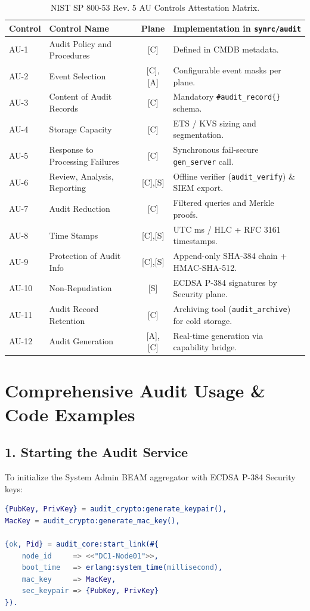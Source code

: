 \documentclass{article}
\begin{document}
\begin{table}[h!]
\centering
\small
\begin{tabular}{lp{6cm}c p{5cm}}
\toprule
\textbf{Control} & \textbf{Control Name} & \textbf{Plane} & \textbf{Implementation in \texttt{synrc/audit}} \\
\midrule
AU-1 & Audit Policy and Procedures & [C] & Defined in CMDB metadata. \\
AU-2 & Event Selection & [C],[A] & Configurable event masks per plane. \\
AU-3 & Content of Audit Records & [C] & Mandatory \texttt{\#audit\_record\{\}} schema. \\
AU-4 & Storage Capacity & [C] & ETS / KVS sizing and segmentation. \\
AU-5 & Response to Processing Failures & [C] & Synchronous fail-secure \texttt{gen\_server} call. \\
AU-6 & Review, Analysis, Reporting & [C],[S] & Offline verifier (\texttt{audit\_verify}) \& SIEM export. \\
AU-7 & Audit Reduction & [C] & Filtered queries and Merkle proofs. \\
AU-8 & Time Stamps & [C],[S] & UTC ms / HLC + RFC 3161 timestamps. \\
AU-9 & Protection of Audit Info & [C],[S] & Append-only SHA-384 chain + HMAC-SHA-512. \\
AU-10 & Non-Repudiation & [S] & ECDSA P-384 signatures by Security plane. \\
AU-11 & Audit Record Retention & [C] & Archiving tool (\texttt{audit\_archive}) for cold storage. \\
AU-12 & Audit Generation & [A],[C] & Real-time generation via capability bridge. \\
\bottomrule
\end{tabular}
\caption{NIST SP 800-53 Rev. 5 AU Controls Attestation Matrix.}
\end{table}

\section{Comprehensive Audit Usage \& Code Examples}

\subsection{1. Starting the Audit Service}
To initialize the System Admin BEAM aggregator with ECDSA P-384 Security keys:
\begin{lstlisting}[language=Erlang]
{PubKey, PrivKey} = audit_crypto:generate_keypair(),
MacKey = audit_crypto:generate_mac_key(),

{ok, Pid} = audit_core:start_link(#{
    node_id     => <<"DC1-Node01">>,
    boot_time   => erlang:system_time(millisecond),
    mac_key     => MacKey,
    sec_keypair => {PubKey, PrivKey}
}).
\end{lstlisting}
\end{document}
